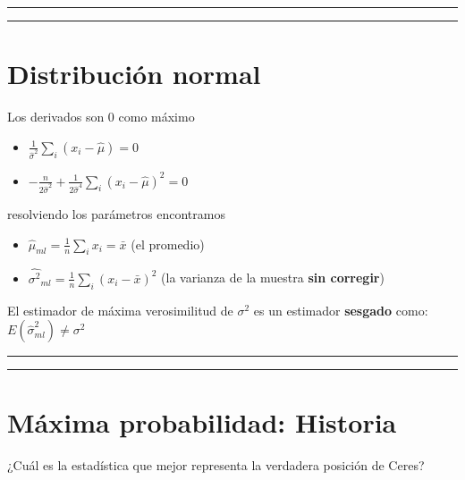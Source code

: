 \documentclass[
]{book}
\providecommand{\tightlist}{%
  \setlength{\itemsep}{0pt}\setlength{\parskip}{0pt}}
\begin{document}
\begin{center}\rule{0.5\linewidth}{0.5pt}\end{center}

\begin{center}\rule{0.5\linewidth}{0.5pt}\end{center}

\hypertarget{distribuciuxf3n-normal-12}{%
\section{Distribución normal}\label{distribuciuxf3n-normal-12}}

Los derivados son \(0\) como máximo

\begin{itemize}
\tightlist
\item
  \(\frac{1}{\hat{\sigma}^2} \sum_i(x_i-\hat{\mu})=0\)
\item
  \(-\frac{n}{2 \hat{\sigma}^2}+\frac{1}{2\hat{\sigma}^4} \sum_i(x_i-\hat{\mu})^2 =0\)
\end{itemize}

resolviendo los parámetros encontramos

\begin{itemize}
\tightlist
\item
  \(\hat{\mu}_{ml}=\frac{1}{n}\sum_i x_i=\bar{x}\) (el promedio)
\item
  \(\hat{\sigma^2}_{ml}=\frac{1}{n}\sum_i(x_i-\bar{x})^2\) (la varianza de la muestra \textbf{sin corregir})
\end{itemize}

El estimador de máxima verosimilitud de \(\sigma^2\) es un estimador \textbf{sesgado} como: \(E(\hat{\sigma}^2_{ml})\neq \sigma^2\)

\begin{center}\rule{0.5\linewidth}{0.5pt}\end{center}

\begin{center}\rule{0.5\linewidth}{0.5pt}\end{center}

\hypertarget{muxe1xima-probabilidad-historia}{%
\section{Máxima probabilidad: Historia}\label{muxe1xima-probabilidad-historia}}

¿Cuál es la estadística que mejor representa la verdadera posición de Ceres?
\end{document}
